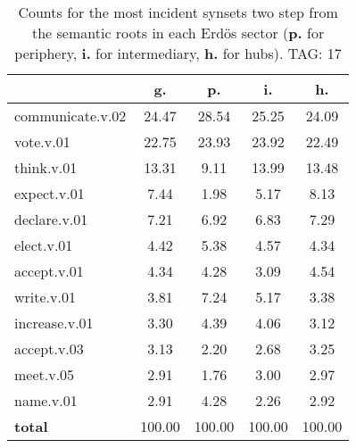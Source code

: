 \begin{table}[h!]
\begin{center}
\begin{tabular}{| l | c | c | c | c |}\hline
 & g. & p. & i. & h. \\\hline
communicate.v.02 & 24.47  & 28.54  & 25.25  & 24.09 \\\hline
vote.v.01 & 22.75  & 23.93  & 23.92  & 22.49 \\\hline
think.v.01 & 13.31  & 9.11  & 13.99  & 13.48 \\\hline
expect.v.01 & 7.44  & 1.98  & 5.17  & 8.13 \\\hline
declare.v.01 & 7.21  & 6.92  & 6.83  & 7.29 \\\hline
elect.v.01 & 4.42  & 5.38  & 4.57  & 4.34 \\\hline
accept.v.01 & 4.34  & 4.28  & 3.09  & 4.54 \\\hline
write.v.01 & 3.81  & 7.24  & 5.17  & 3.38 \\\hline
increase.v.01 & 3.30  & 4.39  & 4.06  & 3.12 \\\hline
accept.v.03 & 3.13  & 2.20  & 2.68  & 3.25 \\\hline
meet.v.05 & 2.91  & 1.76  & 3.00  & 2.97 \\\hline
name.v.01 & 2.91  & 4.28  & 2.26  & 2.92 \\\hline
{{\bf total}} & 100.00  & 100.00  & 100.00  & 100.00 \\\hline
\end{tabular}
\caption{Counts for the most incident synsets two step from the semantic roots in each Erd\"os sector ({\bf p.} for periphery, {\bf i.} for intermediary, {\bf h.} for hubs). TAG: 17}
\end{center}
\end{table}